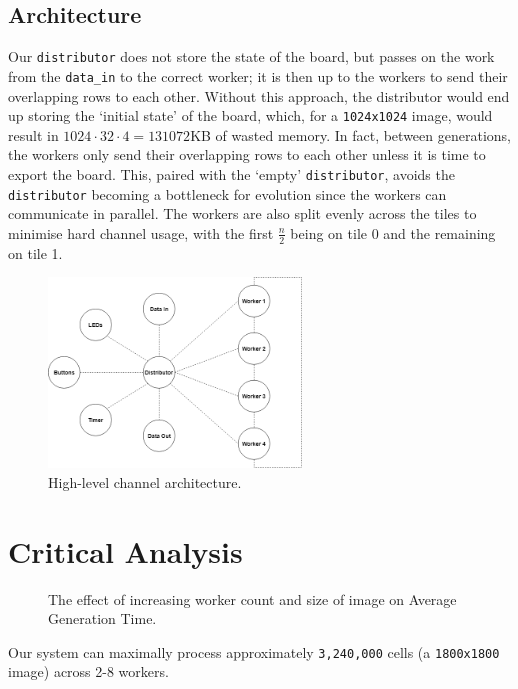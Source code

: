 \documentclass{article}
\begin{document}
    \subsection{Architecture}

    Our \verb|distributor| does not store the state of the board, but passes on the work from the \verb|data_in| to the correct worker; it is then up to the workers to send their overlapping rows to each other. Without this approach, the distributor would end up storing the `initial state' of the board, which, for a \verb|1024x1024| image, would result in $1024 \cdot 32 \cdot 4 = 131072$KB of wasted memory. In fact, between generations, the workers only send their overlapping rows to each other unless it is time to export the board. This, paired with the `empty' \verb|distributor|, avoids the \verb|distributor| becoming a bottleneck for evolution since the workers can communicate in parallel. The workers are also split evenly across the tiles to minimise hard channel usage, with the first $\frac{n}{2}$ being on tile 0 and the remaining on tile 1.

    \begin{figure}[h]
        \begin{center}
            \includegraphics[width=0.6\textwidth]{architecture.png}
            \caption{High-level channel architecture.}
            \label{fig:architecture}
        \end{center}
    \end{figure}

    \pagebreak

    \section{Critical Analysis}
    
    \begin{figure}
        \begin{center}
            
            \caption{The effect of increasing worker count and size of image on Average Generation Time.}
            \label{fig:agt}
        \end{center}
    \end{figure}
    Our system can maximally process approximately \verb|3,240,000| cells (a \verb|1800x1800| image) across 2-8 workers. 
\end{document}
